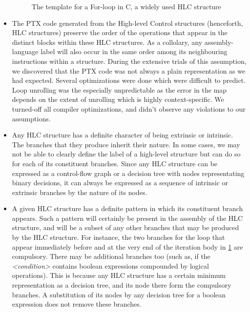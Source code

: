 	\begin{itemize}
	\begin{figure}
		
		\caption{The template for a For-loop in C, a widely used HLC structure
			\label{fig:for_template}}
	\end{figure}
	\item The PTX code generated from the High-level Control structures (henceforth, HLC structures) preserve the order of the operations that appear in the distinct blocks within these HLC structures. As a collolary, any assembly-language label will also occur in the same order among its neighbouring instructions within a structure. During the extensive trials of this assumption, we discovered that the PTX code was not always a plain representation as we had expected. Several optimizations were done which were difficult to predict. Loop unrolling was the especially unpredictable as the error in the map depends on the extent of unrolling which is highly context-specific. We turned-off all compiler optimizations, and didn't observe any violations to our assumptions.

	\item Any HLC structure has a definite character of being extrinsic or intrinsic. The branches that they produce inherit their nature. In some cases, we may not be able to clearly define the label of a high-level structure but can do so for each of its constituent branches. Since any HLC structure can be expressed as a control-flow graph or a decision tree with nodes representating binary decisions, it can always be expressed as a sequence of intrinsic or extrinsic branches by the nature of its nodes.

	\item A given HLC structure has a definite pattern in which its constituent branch appears. Such a pattern will certainly be present in the assembly of the HLC structure, and will be a subset of any other branches that may be produced by the HLC structure. For instance, the two branches for the loop that appear immediately before and at the very end of the iteration body in \ref{fig:for_template} are compulsory. There may be additional branches too (such as, if the \textsl{<condition>} contains boolean expressions compounded by logical operations). This is because any HLC structure has a certain minimum representation as a decision tree, and its node there form the compulsory branches. A substitution of its nodes by any decision tree for a boolean expression does not remove these branches.


\end{itemize}
